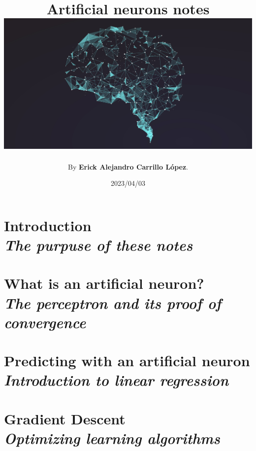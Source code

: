 \documentclass[12pt]{book}
\title{\textbf{Artificial neurons notes}\\
  \vspace{1cm} %
  \includegraphics[scale = 0.7]{cover_page.jpg}
}
\author{By \textbf{Erick Alejandro Carrillo López}.}
\date{2023/04/03}
\newcommand\Chapter[2]{
  \chapter[#1: {\itshape#2}]{#1\\[2ex]\Large\itshape#2}
}
\begin{document}
\maketitle

\tableofcontents
{}

\Chapter{Introduction}{The purpuse of these notes}


\Chapter{What is an artificial neuron?}{The perceptron and its proof of convergence}


\Chapter{Predicting with an artificial neuron}{Introduction to linear regression}


\Chapter{Gradient Descent}{Optimizing learning algorithms}

\end{document}
